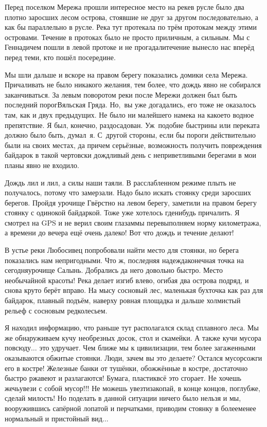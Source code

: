 Перед поселком Мережа прошли интересное место на реке\mdash в русле было два плотно заросших лесом острова, стоявшие не друг за другом последовательно, а как бы параллельно в русле. Река тут протекала по трём протокам между этими островами. Течение в протоках было не просто приличным, а сильным. Мы с Геннадичем пошли в левой протоке и не прогадали\mdash течение вынесло нас вперёд перед теми, кто пошёл посередине.

Мы шли дальше и вскоре на правом берегу показались домики села Мережа. Причаливать не было никакого желания, тем более, что дождь явно не собирался заканчиваться. За левым поворотом реки после Мережи должен был быть последний порог\mdash Вяльская Гряда. Но,~вы уже догадались, его тоже не оказалось там, как и двух предыдущих. Не было ни малейшего намека на какое\sdash то водное препятствие. Я был, конечно, раздосадован. Уж~подобие быстрины или переката должно было быть, думал~я. С~другой стороны, если бы пороги действительно были на своих местах, да причем серьёзные, возможность получить повреждения байдарок в такой чертовски дождливый день с неприветливыми берегами в мои планы явно не входило.

Дождь лил и лил, а силы наши таяли. В расслабленном режиме плыть не получалось, потому что замерзали. Надо было искать стоянку среди заросших берегов. Пройдя урочище Гвёрстно на левом берегу, заметили на правом берегу стоянку с одинокой байдаркой. Тоже уже хотелось где\sdash нибудь причалить. Я смотрел на GPS и не верил своим глазам\mdash мы перевыполняем норму километража, а времени до вечера ещё очень далеко! Вот что дождь и течение делают! 

В устье реки Любосивец попробовали найти место для стоянки, но берега показались нам непригодными. Что ж, последняя надежда\mdash конечная точка на сегодня\mdash урочище Салынь. Добрались да него довольно быстро. Место необычайной красоты! Река делает изгиб влево, огибая два острова подряд, и снова круто берёт вправо. На мысу сосновый лес, маленькая бухточка как раз для байдарок, плавный подъём, наверху ровная площадка и дальше холмистый рельеф с сосновым редколесьем. 

Я находил информацию, что раньше тут располагался склад сплавного леса. Мы же обнаруживаем кучу необрезных досок, стол и скамейки. А также кучи мусора повсюду$\ldots$ это удручает. Чем ближе мы к цивилизации, тем более загаженными оказываются обжитые стоянки. Люди, зачем вы это делаете? Остался мусор\mdash сожги его в костре! Железные банки от тушёнки, обожжённые в костре, достаточно быстро ржавеют и разлагаются! Бумага, пластик\mdash всё это сгорает. Не хочешь жечь\mdash увези с собой мусор!!! Не можешь увезти\mdash закопай, в конце концов, поглубже, сделай милость! Но поделать в данной ситуации ничего было нельзя и мы, вооружившись сапёрной лопатой и перчатками, приводим стоянку в более\sdash менее нормальный и пристойный вид$\ldots$ 


